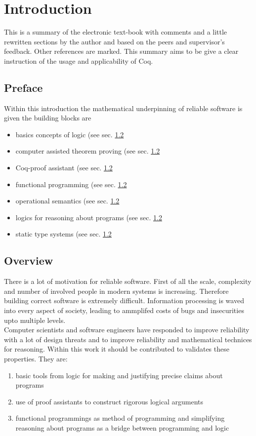 \section{Introduction}

This is a summary of the electronic text-book \cite{PACGGHSY} with comments and a little rewritten sections by the author and based on the peers and supervisor's feedback. 
Other references are marked. 
This summary aims to be give a clear instruction of the usage and applicability of Coq.\\

\subsection{Preface}

Within this introduction the mathematical underpinning of reliable software is given the building blocks are
\begin{itemize}
\item basics concepts of logic (see sec. \ref{} %
\item computer assisted theorem proving (see sec. \ref{} %
\item Coq-proof assistant (see sec. \ref{} %
\item functional programming (see sec. \ref{} %
\item operational semantics (see sec. \ref{} %
\item logics for reasoning about programs (see sec. \ref{} %
\item static type systems (see sec. \ref{} %
\end{itemize} 


\subsection{Overview}

There is a lot of motivation for reliable software. 
First of all the scale, complexity and number of involved people in modern systems is increasing.
Therefore building correct software is extremely difficult.
Information processing is waved into every aspect of society, leading to ammplifed costs of bugs and insecurities upto multiple levels.\\
Computer scientists and software engineers have responded to improve reliability with a lot of design threats and to improve reliability and mathematical technices for reasoning.
Within this work it should be contributed to validates these properties. They are:
\begin{enumerate}
\item basic tools from logic for making and justifying precise claims about programs
\item use of proof assistants to construct rigorous logical arguments
\item functional programmings as method of programming and simplifying reasoning about programs as a bridge between programming and logic
\end{enumerate}



